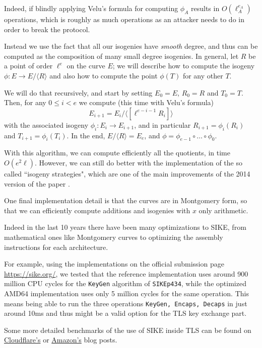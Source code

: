 Indeed, if blindly applying Velu's formula for computing $\phi_A$ results in $O(\ell_A^{e_A})$ operations, which is roughly as much operations as an attacker needs to do in order to break the protocol.

Instead we use the fact that all our isogenies have \emph{smooth} degree, and thus can be computed as the composition of many small degree isogenies. In general, let $R$ be a point of order $\ell^e$ on the curve $E$; we will describe how to compute the isogeny $\phi:E\to E/\langle R\rangle$ and also how to compute the point $\phi(T)$ for any other $T$.

We will do that recursively, and start by setting $E_0=E$, $R_0=R$ and $T_0=T$. Then, for any $0\le i<e$ we compute (this time with Velu's formula) $$E_{i+1}=E_i/\langle [\ell^{e-i-1}R_i] \rangle$$ with the associated isogeny $\phi_i:E_i\to E_{i+1}$, and in particular $R_{i+1}=\phi_i(R_i)$ and $T_{i+1}=\phi_i(T_i)$. In the end, $E/\langle R \rangle=E_e$, and $\phi=\phi_{e-1}\circ\dots\circ\phi_0$.

With this algorithm, we can compute efficiently all the quotients, in time $O(e^2\ell)$. However, we can still do better with the implementation of the so called ``isogeny strategies", which are one of the main improvements of the 2014 version of the paper \cite{SIDH14}.

One final implementation detail is that the curves are in Montgomery form, so that we can efficiently compute additions and isogenies with $x$ only arithmetic.

Indeed in the last 10 years there have been many optimizations to SIKE, from mathematical ones like Montgomery curves to optimizing the assembly instructions for each architecture.

For example, using the implementations on the official submission page \url{https://sike.org/},
we tested that the reference implementation uses around 900 million CPU cycles for the \texttt{KeyGen} algorithm of \texttt{SIKEp434}, while the optimized AMD64 implementation uses only 5 million cycles for the same operation. This means being able to run the three operations \texttt{KeyGen, Encaps, Decaps} in just around 10ms and thus might be a valid option for the TLS key exchange part.

Some more detailed benchmarks of the use of SIKE inside TLS can be found on \href{https://blog.cloudflare.com/the-tls-post-quantum-experiment/}{Cloudflare's} or \href{https://aws.amazon.com/it/blogs/security/round-2-hybrid-post-quantum-tls-benchmarks/}{Amazon's} blog posts.


